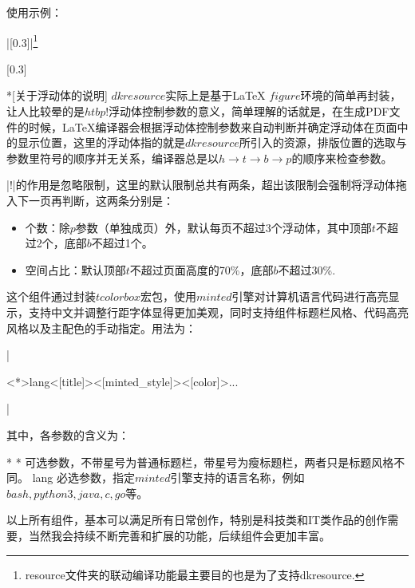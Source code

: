 使用示例：

|[0.3]|\footnote{resource文件夹的联动编译功能最主要目的也是为了支持dkresource.}

[0.3]

\begin{dkcomment}*[关于浮动体的说明]
  \hspace{2em}$dkresource$实际上是基于{\LaTeX} $figure$环境的简单再封装，让人比较晕的是$htbp!$浮动体控制参数的意义，简单理解的话就是，在生成PDF文件的时候，{\LaTeX}编译器会根据浮动体控制参数来自动判断并确定浮动体在页面中的显示位置，这里的浮动体指的就是$dkresource$所引入的资源，排版位置的选取与参数里符号的顺序并无关系，编译器总是以$h \to t \to b \to p$的顺序来检查参数。

  \hspace{2em}|!|的作用是忽略限制，这里的默认限制总共有两条，超出该限制会强制将浮动体拖入下一页再判断，这两条分别是：

  \begin{itemize}
    \item 个数：除$p$参数（单独成页）外，默认每页不超过3个浮动体，其中顶部$t$不超过2个，底部$b$不超过1个。
    \item 空间占比：默认顶部$t$不超过页面高度的70\%，底部$b$不超过30\%.
  \end{itemize}
\end{dkcomment}

这个组件通过封装$tcolorbox$宏包，使用$minted$引擎对计算机语言代码进行高亮显示，支持中文并调整行距字体显得更加美观，同时支持组件标题栏风格、代码高亮风格以及主配色的手动指定。用法为：

|\begin{dkcode}<*>{lang}<[title]><[minted_style]><[color]>...\end{dkcode}|

其中，各参数的含义为：

\begin{cvskills}*
  \cvskill
  {*}
  {可选参数，不带星号为普通标题栏，带星号为瘦标题栏，两者只是标题风格不同。}
  \cvskill
  {lang}
  {必选参数，指定$minted$引擎支持的语言名称，例如$bash, python3, java, c, go$等。}
\end{cvskills}





以上所有组件，基本可以满足所有日常创作，特别是科技类和IT类作品的创作需要，当然我会持续不断完善和扩展{\dk}的功能，后续组件会更加丰富。


\clearpage
